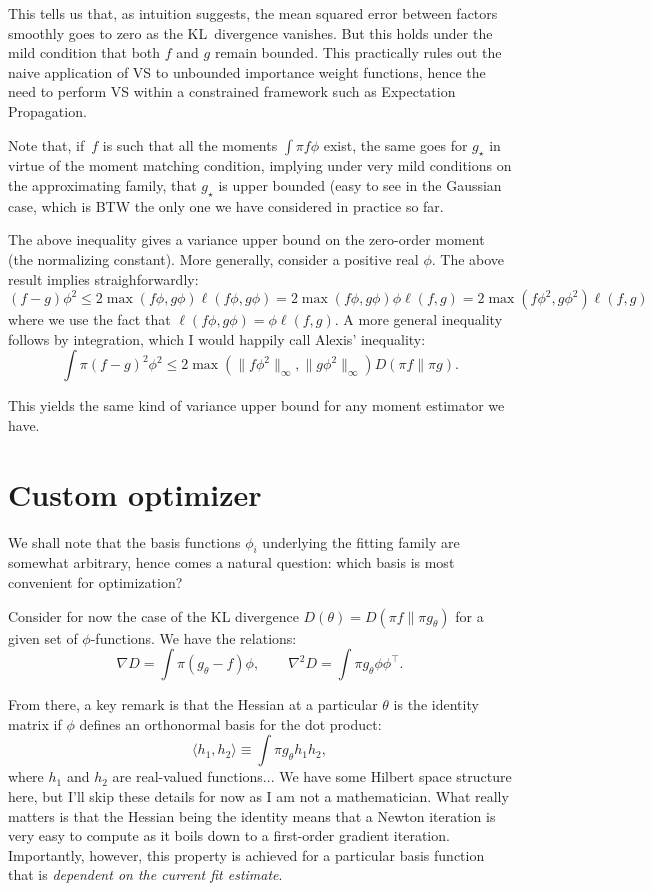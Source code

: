 \documentclass{article}
\begin{document}
This tells us that, as intuition suggests, the mean squared error between factors smoothly goes to zero as the KL~divergence vanishes. But this holds under the mild condition that both $f$ and $g$ remain bounded. This practically rules out the naive application of VS to unbounded importance weight functions, hence the need to perform VS within a constrained framework such as Expectation Propagation.

Note that, if~$f$ is such that all the moments $\int\pi f \phi$ exist, the same goes for $g_\star$ in virtue of the moment matching condition, implying under very mild conditions on the approximating family, that $g_\star$ is upper bounded (easy to see in the Gaussian case, which is BTW the only one we have considered in practice so far.

The above inequality gives a variance upper bound on the zero-order moment (the normalizing constant). More generally, consider a positive real $\phi$. The above result implies straighforwardly:
$$
(f-g)\phi^2
\leq 2 \max(f\phi, g\phi) \ell(f\phi, g\phi)
= 2 \max(f\phi, g\phi) \phi\ell(f, g)
= 2 \max(f\phi^2, g\phi^2) \ell(f, g)
$$
where we use the fact that $\ell(f\phi,g\phi)=\phi\ell(f,g)$. A more general inequality follows by integration, which I would happily call Alexis' inequality:
$$
\int \pi (f-g)^2\phi^2 \leq 2\max(\|f\phi^2\|_\infty, \|g\phi^2\|_\infty) D(\pi f\|\pi g).
$$

This yields the same kind of variance upper bound for any moment estimator we have.


\section{Custom optimizer}

We shall note that the basis functions $\phi_i$ underlying the fitting family are somewhat arbitrary, hence comes a natural question: which basis is most convenient for optimization?

Consider for now the case of the KL divergence $D(\theta)=D(\pi f\|\pi g_\theta)$ for a given set of $\phi$-functions. We have the relations:
$$
\nabla D = \int \pi (g_\theta-f) \phi,
\qquad
\nabla^2 D = \int \pi g_\theta \phi\phi^\top.
$$

From there, a key remark is that the Hessian at a particular $\theta$ is the identity matrix if $\phi$ defines an orthonormal basis for the dot product:
$$
\langle h_1, h_2 \rangle \equiv \int \pi g_{\theta} h_1 h_2,
$$
where $h_1$ and $h_2$ are real-valued functions... We have some Hilbert space structure here, but I'll skip these details for now as I am not a mathematician. What really matters is that the Hessian being the identity means that a Newton iteration is very easy to compute as it boils down to a first-order gradient iteration. Importantly, however, this property is achieved for a particular basis function that is {\em dependent on the current fit estimate}.
\end{document}
